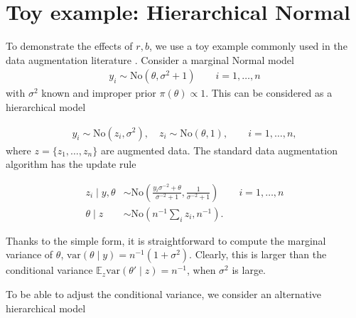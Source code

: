 \documentclass[twoside,11pt]{article}
\newcommand{\No}{\text{No}}
\newcommand{\1}{\mathbf 1}
\begin{document}
{\section{Toy example: Hierarchical Normal \label{gaussian_example}}

To demonstrate the effects of $r,b$, we use a toy example commonly used in the data augmentation literature \citep{liu1999parameter}. Consider a marginal Normal model
\begin{equation*}
	\begin{aligned}
    y_i \sim \No(\theta, \sigma^2+1) \qquad i=1,\ldots,n
	\end{aligned}
\end{equation*}
with $\sigma^2$ known and improper prior $\pi(\theta)\propto 1$. This can be considered as a hierarchical model

\begin{equation}
\label{hier_normal_model}
	\begin{aligned}
    y_i \sim \No(z_i, \sigma^2), \quad z_i\sim \No(\theta,1), \qquad i=1,\ldots,n,
	\end{aligned}
\end{equation}
where $z=\{z_1,\ldots,z_n\}$ are augmented data. The standard data augmentation algorithm has the update rule

\begin{equation*}
	\begin{aligned}
    z_i \mid y,\theta&\sim \No \left(\frac{y_i\sigma^{-2}+\theta}{\sigma^{-2}+1}, \frac{1}{\sigma^{-2}+1} \right) \qquad i=1,\ldots,n \\
    \theta \mid z & \sim \No({n}^{-1}{\sum_i z_i}, {n}^{-1}).
	\end{aligned}
\end{equation*}

Thanks to the simple form, it is straightforward to compute the marginal variance of $\theta$, $\mbox{var}(\theta\mid y) = {n}^{-1}(1+\sigma^2)$. Clearly, this is larger than the conditional variance  $\mathbb{E}_z\mbox{var}(\theta'\mid z)=n^{-1}$, when $\sigma^2$ is large.

To be able to adjust the conditional variance, we consider an alternative hierarchical model

}
\end{document}
